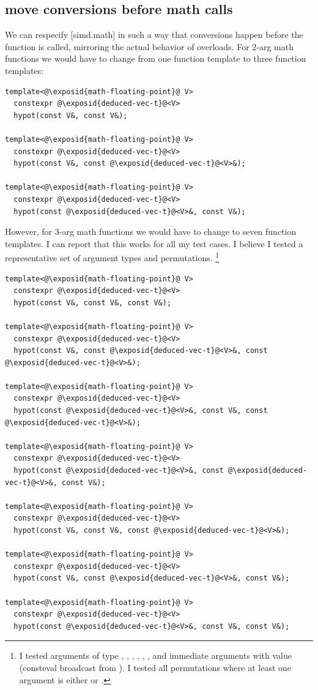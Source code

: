 \subsection{move conversions before math calls}\label{sec:math2}

We can respecify [simd.math] in such a way that conversions happen before the function is called,
mirroring the actual behavior of  overloads.
For 2-arg math functions we would have to change from one function template to three function
templates:
\medskip\begin{lstlisting}[style=Vc]
template<@\exposid{math-floating-point}@ V>
  constexpr @\exposid{deduced-vec-t}@<V>
  hypot(const V&, const V&);

template<@\exposid{math-floating-point}@ V>
  constexpr @\exposid{deduced-vec-t}@<V>
  hypot(const V&, const @\exposid{deduced-vec-t}@<V>&);

template<@\exposid{math-floating-point}@ V>
  constexpr @\exposid{deduced-vec-t}@<V>
  hypot(const @\exposid{deduced-vec-t}@<V>&, const V&);
\end{lstlisting}
However, for 3-arg math functions we would have to change to seven function templates.
I can report that this works for all my test cases.
I believe I tested a representative set of argument types and permutations.%
\footnote{I tested arguments of type ,
  , , , ,
  , and immediate arguments with value  (consteval broadcast from ). I
  tested all permutations where at least one argument is either  or
  .
}
\medskip\begin{lstlisting}[style=Vc]
template<@\exposid{math-floating-point}@ V>
  constexpr @\exposid{deduced-vec-t}@<V>
  hypot(const V&, const V&, const V&);

template<@\exposid{math-floating-point}@ V>
  constexpr @\exposid{deduced-vec-t}@<V>
  hypot(const V&, const @\exposid{deduced-vec-t}@<V>&, const @\exposid{deduced-vec-t}@<V>&);

template<@\exposid{math-floating-point}@ V>
  constexpr @\exposid{deduced-vec-t}@<V>
  hypot(const @\exposid{deduced-vec-t}@<V>&, const V&, const @\exposid{deduced-vec-t}@<V>&);

template<@\exposid{math-floating-point}@ V>
  constexpr @\exposid{deduced-vec-t}@<V>
  hypot(const @\exposid{deduced-vec-t}@<V>&, const @\exposid{deduced-vec-t}@<V>&, const V&);

template<@\exposid{math-floating-point}@ V>
  constexpr @\exposid{deduced-vec-t}@<V>
  hypot(const V&, const V&, const @\exposid{deduced-vec-t}@<V>&);

template<@\exposid{math-floating-point}@ V>
  constexpr @\exposid{deduced-vec-t}@<V>
  hypot(const V&, const @\exposid{deduced-vec-t}@<V>&, const V&);

template<@\exposid{math-floating-point}@ V>
  constexpr @\exposid{deduced-vec-t}@<V>
  hypot(const @\exposid{deduced-vec-t}@<V>&, const V&, const V&);
\end{lstlisting}

